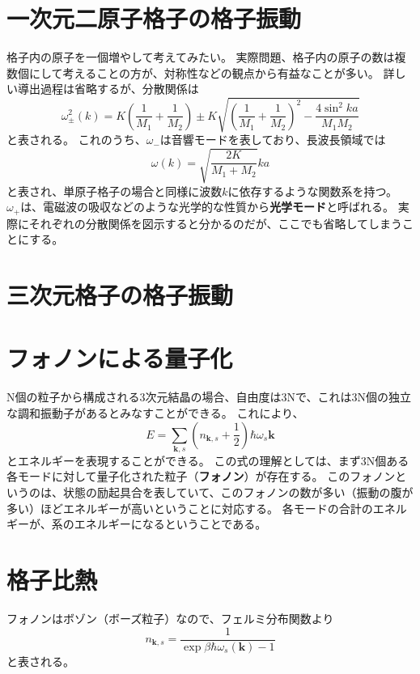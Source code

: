 \documentclass[a4paper]{jsreport}
\begin{document}
        \section{一次元二原子格子の格子振動}
            格子内の原子を一個増やして考えてみたい。
            実際問題、格子内の原子の数は複数個にして考えることの方が、対称性などの観点から有益なことが多い。
            詳しい導出過程は省略するが、分散関係は
            \begin{equation}
                \omega_{\pm}^2(k) = K \left(\frac{1}{M_1} + \frac{1}{M_2} \right) \pm K \sqrt{\left(\frac{1}{M_1} + \frac{1}{M_2} \right)^2 - \frac{4\sin^2{ka}}{M_1M_2}}
            \end{equation}
            と表される。
            これのうち、$\omega_-$は音響モードを表しており、長波長領域では
            \begin{equation}
                \omega(k) = \sqrt{\frac{2K}{M_1 + M_2}}ka
            \end{equation}
            と表され、単原子格子の場合と同様に波数$k$に依存するような関数系を持つ。
            $\omega_+$は、電磁波の吸収などのような光学的な性質から\textbf{光学モード}と呼ばれる。
            実際にそれぞれの分散関係を図示すると分かるのだが、ここでも省略してしまうことにする。

        \section{三次元格子の格子振動}
        \section{フォノンによる量子化}
            N個の粒子から構成される3次元結晶の場合、自由度は3Nで、これは3N個の独立な調和振動子があるとみなすことができる。
            これにより、
            \begin{equation}
                E = \sum_{\boldsymbol{k}, s} \left(n_{\boldsymbol{k},s} + \frac{1}{2}\right) \hbar \omega_s{\boldsymbol{k}}
            \end{equation}
            とエネルギーを表現することができる。
            この式の理解としては、まず3N個ある各モードに対して量子化された粒子（\textbf{フォノン}）が存在する。
            このフォノンというのは、状態の励起具合を表していて、このフォノンの数が多い（振動の腹が多い）ほどエネルギーが高いということに対応する。
            各モードの合計のエネルギーが、系のエネルギーになるということである。

        \section{格子比熱}
            フォノンはボゾン（ボーズ粒子）なので、フェルミ分布関数より
            \begin{equation}
                n_{\boldsymbol{k}, s} = \frac{1}{\exp{\beta \hbar \omega_s(\boldsymbol{k})} - 1}
            \end{equation}
            と表される。
\end{document}
